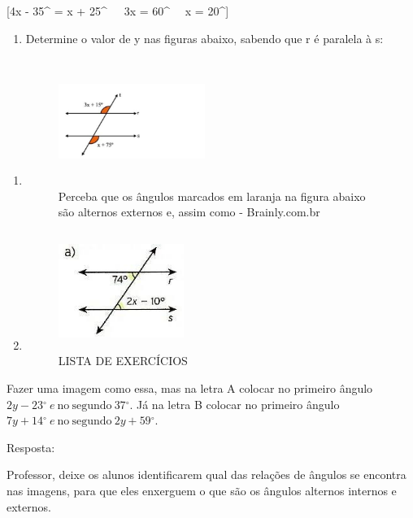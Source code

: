 [4x - 35{^\circ} = x + 25{^\circ}\  \rightarrow \ \ 3x = 60{^\circ} \rightarrow \ \ x = 20{^\circ}]

\begin{enumerate}
\def\labelenumi{\arabic{enumi})}
\setcounter{enumi}{2}
\tightlist
\item
  Determine o valor de y nas figuras abaixo, sabendo que r é paralela à
  s:
\end{enumerate}

\begin{enumerate}
\def\labelenumi{\alph{enumi})}
\item
  \begin{figure}
  \centering
  \includegraphics[width=1.87815in,height=1.6236in]{./imgSAEB_7_MAT/media/image43.jpg}
  \caption{Perceba que os ângulos marcados em laranja na figura abaixo
  são alternos externos e, assim como - Brainly.com.br}
  \end{figure}
\item
  \begin{figure}
  \centering
  \includegraphics[width=1.60417in,height=1.51042in]{./imgSAEB_7_MAT/media/image44.jpg}
  \caption{LISTA DE EXERCÍCIOS}
  \end{figure}
\end{enumerate}

Fazer uma imagem como essa, mas na letra A colocar no primeiro ângulo
\(2y - 23{^\circ}\ e\ \text{no}\ \text{segundo}\ 37{^\circ}\). Já na
letra B colocar no primeiro ângulo
\(7y + 14{^\circ}\ e\ \text{no}\ \text{segundo}\ 2y + 59{^\circ}\).

Resposta:

Professor, deixe os alunos identificarem qual das relações de ângulos se
encontra nas imagens, para que eles enxerguem o que são os ângulos
alternos internos e externos.

